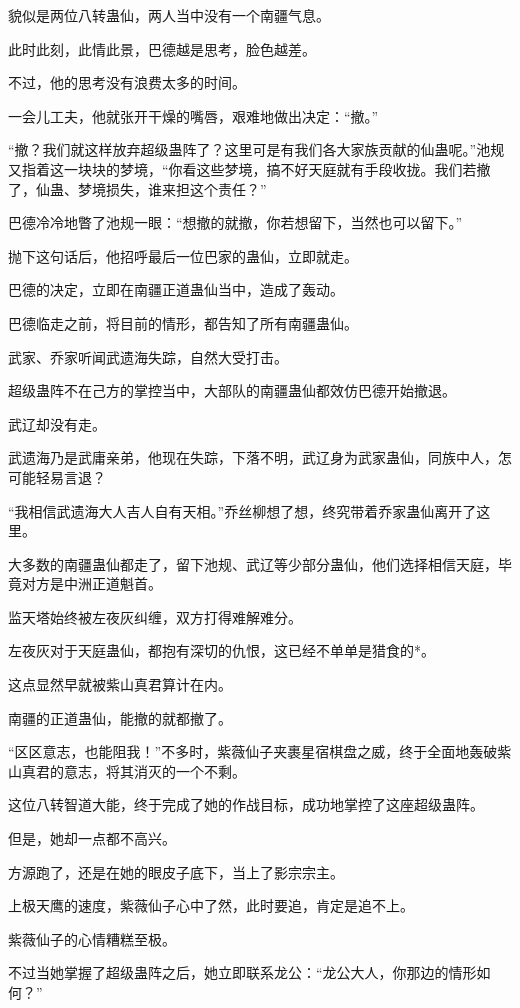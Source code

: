 \begin{this_body}
貌似是两位八转蛊仙，两人当中没有一个南疆气息。

此时此刻，此情此景，巴德越是思考，脸色越差。

不过，他的思考没有浪费太多的时间。

一会儿工夫，他就张开干燥的嘴唇，艰难地做出决定：“撤。”

“撤？我们就这样放弃超级蛊阵了？这里可是有我们各大家族贡献的仙蛊呢。”池规又指着这一块块的梦境，“你看这些梦境，搞不好天庭就有手段收拢。我们若撤了，仙蛊、梦境损失，谁来担这个责任？”

巴德冷冷地瞥了池规一眼：“想撤的就撤，你若想留下，当然也可以留下。”

抛下这句话后，他招呼最后一位巴家的蛊仙，立即就走。

巴德的决定，立即在南疆正道蛊仙当中，造成了轰动。

巴德临走之前，将目前的情形，都告知了所有南疆蛊仙。

武家、乔家听闻武遗海失踪，自然大受打击。

超级蛊阵不在己方的掌控当中，大部队的南疆蛊仙都效仿巴德开始撤退。

武辽却没有走。

武遗海乃是武庸亲弟，他现在失踪，下落不明，武辽身为武家蛊仙，同族中人，怎可能轻易言退？

“我相信武遗海大人吉人自有天相。”乔丝柳想了想，终究带着乔家蛊仙离开了这里。

大多数的南疆蛊仙都走了，留下池规、武辽等少部分蛊仙，他们选择相信天庭，毕竟对方是中洲正道魁首。

监天塔始终被左夜灰纠缠，双方打得难解难分。

左夜灰对于天庭蛊仙，都抱有深切的仇恨，这已经不单单是猎食的*。

这点显然早就被紫山真君算计在内。

南疆的正道蛊仙，能撤的就都撤了。

“区区意志，也能阻我！”不多时，紫薇仙子夹裹星宿棋盘之威，终于全面地轰破紫山真君的意志，将其消灭的一个不剩。

这位八转智道大能，终于完成了她的作战目标，成功地掌控了这座超级蛊阵。

但是，她却一点都不高兴。

方源跑了，还是在她的眼皮子底下，当上了影宗宗主。

上极天鹰的速度，紫薇仙子心中了然，此时要追，肯定是追不上。

紫薇仙子的心情糟糕至极。

不过当她掌握了超级蛊阵之后，她立即联系龙公：“龙公大人，你那边的情形如何？”


\end{this_body}
